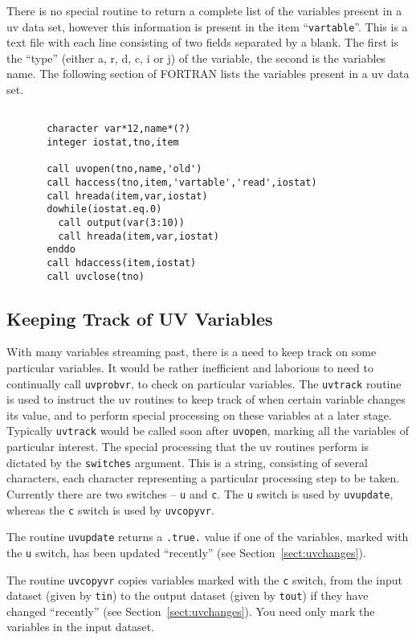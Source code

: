 \documentclass{report}
\begin{document}
There is no special routine to return a complete list of the variables
present in a uv data set, however this information is present in the
item ``{\tt vartable}''. This is a text file with each line
consisting of two fields separated by a blank. The first is the ``type''
(either a, r, d, c, i or j) of the variable, the second is the variables name.
The following section of FORTRAN lists the variables present in a
uv data set.
\begin{verbatim}

       character var*12,name*(?)
       integer iostat,tno,item

       call uvopen(tno,name,'old')
       call haccess(tno,item,'vartable','read',iostat)
       call hreada(item,var,iostat)
       dowhile(iostat.eq.0)
         call output(var(3:10))
         call hreada(item,var,iostat)
       enddo
       call hdaccess(item,iostat)
       call uvclose(tno)

\end{verbatim}

\subsection{Keeping Track of UV Variables}
With many variables streaming past, there is a need to keep track on some
particular variables. It would be rather inefficient and laborious to need
to continually call {\tt uvprobvr}, to check on particular variables. The
{\tt uvtrack} routine is used to instruct the uv routines to keep track
of when certain variable changes its value, and to perform special
processing on these variables at a later stage. Typically {\tt uvtrack}
would be called soon after {\tt uvopen}, marking all the variables of
particular interest. The special processing that the uv routines perform
is dictated by the {\tt switches} argument. This is a string,
consisting of several characters, each character representing a particular
processing step to be taken. Currently there are two switches --
{\tt u} and {\tt c}. The {\tt u} switch is used by {\tt uvupdate}, whereas
the {\tt c} switch is used by {\tt uvcopyvr}.

The routine
{\tt uvupdate} returns a {\tt .true.} value if one of the variables, marked
with the {\tt u} switch, has been updated ``recently''
(see Section~\ref{sect:uvchanges}).

The routine {\tt uvcopyvr} copies variables marked with the {\tt c}
switch, from the input dataset (given by {\tt tin}) to the output
dataset (given by {\tt tout}) if they have changed ``recently'' (see
Section~\ref{sect:uvchanges}). You need only
mark the variables in the input dataset.
\end{document}
